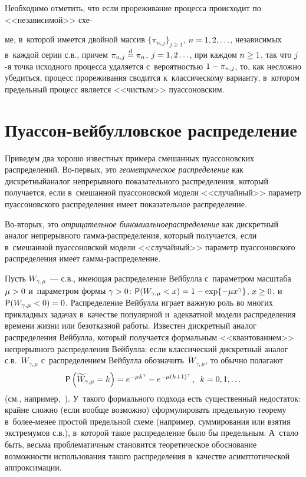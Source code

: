 \begin{multicols}{2}
\smallskip

Необходимо отметить, что если прореживание процесса происходит по
<<независимой>> схе-\linebreak\vspace*{-12pt}

\pagebreak

\noindent
ме, в~которой имеется двойной массив
$\{\pi_{n,j}\}_{j\ge1}$,
 $n\hm=1,2,\ldots$, независимых в~каждой серии с.в., 
причем $\pi_{n,j}\stackrel{\mathrm{d}}{=}\pi_n$, $j\hm=1,2\ldots$, при каждом $n\hm\ge1$, так
что $j$-я точка исходного процесса удаляется с~ве\-ро\-ят\-ностью
$1\hm-\pi_{n,j}$, то, как несложно убедиться, процесс прореживания
сводится к~классическому варианту, в~котором предельный процесс
является <<чистым>> пуассоновским.

\section{Пуассон-вейбулловское распределение}

Приведем два хорошо известных примера смешанных пуассоновских
распределений. Во-пер\-вых, это \textit{геометрическое распределение} как
дискретный\linebreak аналог непрерывного показательного распределения, который
получается, если в~смешанной пу\-ассоновской модели <<случайный>>
параметр пу\-ас\-соновского распределения имеет показательное
распреде\-ление.

Во-вторых, это \textit{отрицательное биномиальное\linebreak распределение} как
дискретный аналог непрерывного гам\-ма-рас\-пре\-де\-ле\-ния, который
получается, если в~смешанной пуассоновской модели <<случайный>>
параметр пуассоновского распределения имеет гам\-ма-рас\-пре\-де\-ле\-ние.

Пусть $W_{\gamma, \mu}$~--- с.в., имеющая распределение Вейбулла 
с~параметром масштаба $\mu\hm>0$ и~параметром формы $\gamma\hm>0$: 
${\sf P}(W_{\gamma,\mu}\hm<x)\hm=1\hm-\exp\{-\mu x^{\gamma}\}$, $x\hm\ge0$, 
и~${\sf P}(W_{\gamma,\mu}\hm<0)\hm=0$. Распределение Вейбулла играет важную роль
во многих прикладных задачах в~качестве популярной и~адекватной
модели распределения времени жизни или безотказной работы. Известен
дискретный аналог распределения Вейбулла, который получается
формальным <<квантованием>> непрерывного распределения Вейбулла:
если классический дискретный аналог с.в.~$W_{\gamma,\mu}$ 
с~распределением Вейбулла обозначить~$\widetilde W_{\gamma,\mu}$, то
обычно полагают
$$
{\sf P}\left(\widetilde W_{\gamma,\mu}=k\right)=e^{-\mu k^{\gamma}}-
e^{-\mu(k+1)^{\gamma}}\,,\enskip k=0,1,\ldots
$$
(см., например,~\cite{NakagawaOsaki1975}). У~такого формального
подхода есть существенный недостаток: крайне сложно (если вообще
возможно) сформулировать предельную теорему в~бо\-лее-ме\-нее простой
предельной схеме (например, суммирования или взятия экстремумов с.в.), 
в~которой такое распределение было бы предельным. А~стало быть,
весьма проблематичным становится теоретическое обоснование
воз\-мож\-ности использования такого распределения в~качестве
асимптотической аппроксимации.


\end{multicols}
